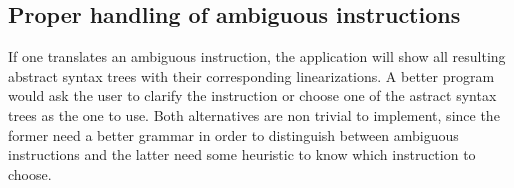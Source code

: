 \subsection*{Proper handling of ambiguous instructions}
If one translates an ambiguous instruction, the application will show all resulting abstract syntax trees with their corresponding linearizations. A better program would ask the user to clarify the instruction or choose one of the astract syntax trees as the one to use. Both alternatives are non trivial to implement, since the former need a better grammar in order to distinguish between ambiguous instructions and the latter need some heuristic to know which instruction to choose.